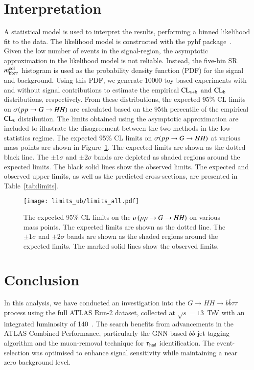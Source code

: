 \section{Interpretation}\label{sec:grav:interp}
    A statistical model is used to interpret the results, performing a binned likelihood fit to the data. 
    The likelihood model is constructed with the pyhf package~\cite{pyhf_joss}. 
    Given the low number of events in the signal-region, the asymptotic approximation in the likelihood model is not reliable. 
    Instead, the five-bin SR $m_\mathrm{bb\tau\tau}^\mathrm{col}$ histogram is used as the probability density function (PDF) for the signal and background. 
    Using this PDF, we generate 10000 toy-based experiments with and without signal contributions to estimate the empirical 
    $\mathrm{CL}_\mathrm{s+b}$ and $\mathrm{CL}_\mathrm{b}$~\cite{Read:2002hq} distributions, respectively. 
    From these distributions, the expected 95\% CL limits on $\sigma(pp\rightarrow G \rightarrow HH)$ are calculated based on the 95th percentile of the empirical $\mathrm{CL}_\mathrm{s}$ distribution.
    The limits obtained using the asymptotic approximation are included to illustrate the disagreement between the two methods in the low-statistics regime.
    The expected 95\% CL limits on $\sigma(pp\rightarrow G \rightarrow HH)$ at various mass points are shown in Figure~\ref{fig:limits}. 
    The expected limits are shown as the dotted black line. 
    The $\pm 1\sigma$ and $\pm 2\sigma$ bands are depicted as shaded regions around the expected limits. 
    The black solid lines show the observed limits. 
    The expected and observed upper limits, as well as the predicted cross-sections, are presented in Table~\ref{tab:limits}.

    \begin{figure}[htbp]
        \centering
        \texttt{[image: limits\_ub/limits\_all.pdf]}
        \caption{
            The expected 95\% CL limits on the $\sigma(pp\rightarrow G \rightarrow HH)$ on various mass points. 
            The expected limits are shown as the dotted line. 
            The $\pm 1\sigma$ and $\pm 2\sigma$ bands are shown as the shaded regions around the expected limits.
            The marked solid lines show the observed limits.
        }
        \label{fig:limits}
    \end{figure}

    

\FloatBarrier

\section{Conclusion}\label{sec:grav:conc}
    In this analysis, we have conducted an investigation into the $G \rightarrow HH \rightarrow b\bar{b}\tau\tau$ 
    process using the full ATLAS Run-2 dataset, collected at \(\sqrt{s} = 13\)~TeV with an integrated luminosity of 140~\ifb. 
    The search benefits from advancements in the ATLAS Combined Performance, 
    particularly the GNN-based $b\bar{b}$-jet tagging algorithm and the muon-removal technique for $\tau_{\text{had}}$ identification. 
    The event-selection was optimised to enhance signal sensitivity while maintaining a near zero background level.


